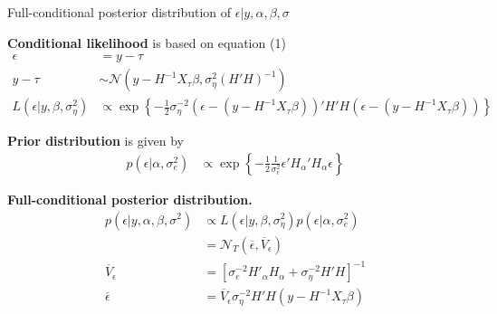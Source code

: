 \documentclass[notes,blackandwhite,mathsans,usenames,dvipsnames]{beamer}
\begin{document}
\begin{frame}{Full-conditional posterior distribution of $\epsilon|y,\alpha,\beta,\sigma$}

\small
\bigskip\textbf{Conditional likelihood} {\color{mcxs2}is based on equation} (1)
\begin{align*}
\epsilon &=y -\tau\\
y-\tau  &\sim\mathcal{N}\left(y-H^{-1} X_\tau \beta, \sigma^2_\eta (H'H)^{-1}\right)\\
L\left(\epsilon|y,\beta,\sigma^2_\eta\right)&\propto\exp\left\{-\frac{1}{2}\sigma^{-2}_\eta\left(\epsilon-(y-H^{-1}X_\tau \beta)\right)'H'H\left(\epsilon-(y-H^{-1}X_\tau \beta)\right)  \right\}
\end{align*}

\smallskip\textbf{Prior distribution} {\color{mcxs2}is given by}
\begin{align*}
p\left(\epsilon|\alpha,\sigma^2_e\right) &\propto \exp\left\{-\frac{1}{2}\frac{1}{\sigma^2_e} \epsilon'H_{\alpha}'H_{\alpha}\epsilon \right\}
\end{align*}


\smallskip\textbf{Full-conditional posterior distribution.}
\begin{align*}
p\left( \epsilon|y,\alpha,\beta,\sigma^2 \right)&\propto L\left(\epsilon|y,\beta,\sigma^2_\eta\right)p\left(\epsilon|\alpha,\sigma^2_e\right)\\
&= \mathcal{N}_T\left(\overline{\epsilon},\overline{V}_\epsilon\right)\\
\overline{V}_\epsilon &= \left[\sigma^{-2} _eH'_\alpha H_\alpha + \sigma^{-2} _\eta H' H \right]^{-1}\\
\overline{\epsilon} &= \overline{V}_\epsilon \sigma^{-2} _\eta H'H\left(y- H^{-1}X_\tau \beta \right)
\end{align*}

\end{frame}
\end{document}

